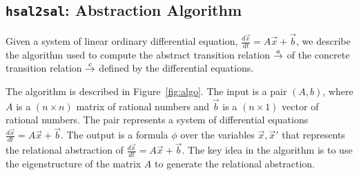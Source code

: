 \documentclass{llncs}
\begin{document}
\subsection{{\tt{hsal2sal}}: Abstraction Algorithm}

Given a system of linear ordinary differential equation,
$\frac{d\vec{x}}{dt} = A\vec{x}+\vec{b}$, we describe the
algorithm used to compute the abstract transition relation
${\stackrel{a}{\rightarrow}}$ of the concrete transition relation ${\stackrel{c}{\rightarrow}}$ defined
by the differential equations.

The algorithm is described in Figure~\ref{fig:algo}.  
The input is a pair $(A,b)$, where
$A$ is a $(n\times n)$ matrix of rational numbers
and $\vec{b}$ is a $(n\times 1)$ vector of rational numbers.
The pair represents a system of differential equations
$\frac{d\vec{x}}{dt} = A\vec{x}+\vec{b}$.
The output is a formula $\phi$ over the variables
$\vec{x},\vec{x}'$ that represents the relational
abstraction of $\frac{d\vec{x}}{dt} = A\vec{x}+\vec{b}$.
The key idea in the algorithm is to use 
the eigenstructure of the matrix $A$ to generate the
relational abstraction.
\end{document}

